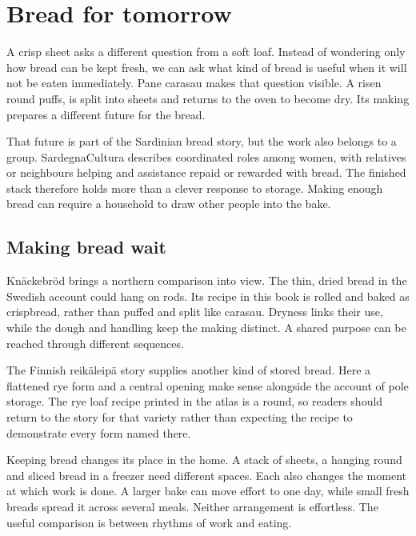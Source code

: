 \chapter{Bread for tomorrow}\label{connection:keeping}

A crisp sheet asks a different question from a soft loaf. Instead of wondering only how bread can be kept fresh, we can ask what kind of bread is useful when it will not be eaten immediately. Pane carasau makes that question visible. A risen round puffs, is split into sheets and returns to the oven to become dry. Its making prepares a different future for the bread.\citep{carasaurecipe,carasauculture}

That future is part of the Sardinian bread story, but the work also belongs to a group. SardegnaCultura describes coordinated roles among women, with relatives or neighbours helping and assistance repaid or rewarded with bread. The finished stack therefore holds more than a clever response to storage. Making enough bread can require a household to draw other people into the bake.\citep{carasauculture}

\section{Making bread wait}
Knäckebröd brings a northern comparison into view. The thin, dried bread in the Swedish account could hang on rods. Its recipe in this book is rolled and baked as crispbread, rather than puffed and split like carasau. Dryness links their use, while the dough and handling keep the making distinct. A shared purpose can be reached through different sequences.\citep{duxknack,daumknack}

The Finnish reikäleipä story supplies another kind of stored bread. Here a flattened rye form and a central opening make sense alongside the account of pole storage. The rye loaf recipe printed in the atlas is a round, so readers should return to the story for that variety rather than expecting the recipe to demonstrate every form named there.\citep{finroot}

Keeping bread changes its place in the home. A stack of sheets, a hanging round and sliced bread in a freezer need different spaces. Each also changes the moment at which work is done. A larger bake can move effort to one day, while small fresh breads spread it across several meals. Neither arrangement is effortless. The useful comparison is between rhythms of work and eating.

